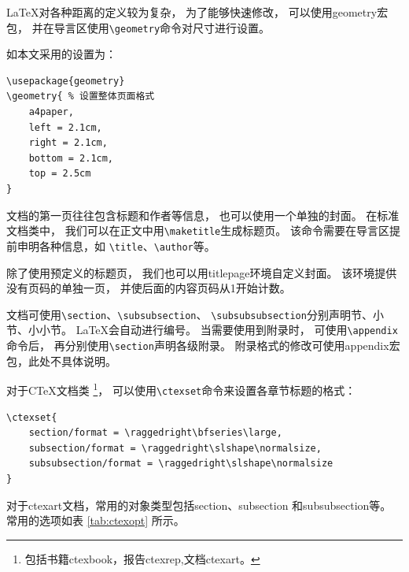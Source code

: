 \documentclass[UTF8]{ctexart}
\numberwithin{equation}{section}			%
\begin{document}
    \LaTeX 对各种距离的定义较为复杂，
    为了能够快速修改，
    可以使用geometry宏包，
    并在导言区使用\verb|\geometry|命令对尺寸进行设置。
    
    如本文采用的设置为：
    
\begin{lstlisting}
\usepackage{geometry}
\geometry{ % 设置整体页面格式
    a4paper,
    left = 2.1cm,
    right = 2.1cm,
    bottom = 2.1cm,
    top = 2.5cm
}
\end{lstlisting}
    
    文档的第一页往往包含标题和作者等信息，
    也可以使用一个单独的封面。
    在标准文档类中，
    我们可以在正文中用\verb|\maketitle|生成标题页。
    该命令需要在导言区提前申明各种信息，如
    \verb|\title|、\verb|\author|等。
    
    除了使用预定义的标题页，
    我们也可以用titlepage环境自定义封面。
    该环境提供没有页码的单独一页，
    并使后面的内容页码从1开始计数。
    
    文档可使用\verb|\section|、\verb|\subsubsection|、
    \verb|\subsubsubsection|分别声明节、小节、小小节。
    \LaTeX 会自动进行编号。
    当需要使用到附录时，
    可使用\verb|\appendix|命令后，
    再分别使用\verb|\section|声明各级附录。
    附录格式的修改可使用appendix宏包，此处不具体说明。
    
    对于C\TeX 文档类
    \footnote{包括书籍ctexbook，报告ctexrep,文档ctexart。}，
    可以使用\verb|\ctexset|命令来设置各章节标题的格式：
    
\begin{lstlisting}
\ctexset{
    section/format = \raggedright\bfseries\large,
    subsection/format = \raggedright\slshape\normalsize,
    subsubsection/format = \raggedright\slshape\normalsize
}
\end{lstlisting}

    对于ctexart文档，常用的对象类型包括section、subsection
    和subsubsection等。
    常用的选项如表 \ref{tab:ctexopt} 所示。
    
\end{document}
